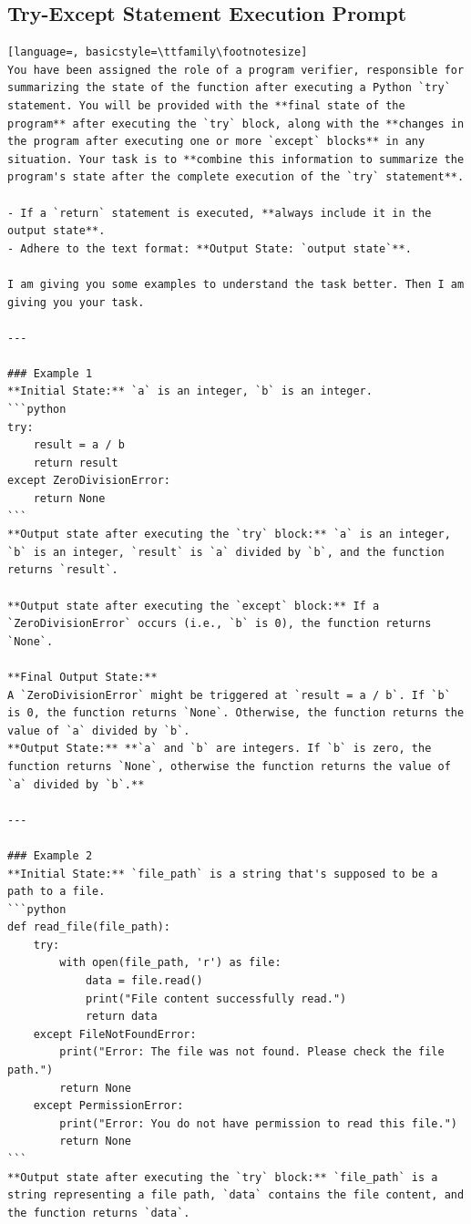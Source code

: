 \documentclass[sigconf]{acmart}
\begin{document}
\subsection{Try-Except Statement Execution Prompt}
\label{try_except_prompt}
\begin{tcolorbox}[ colback=gray!10, colframe=black, arc=5pt]
\begin{lstlisting}[language=, basicstyle=\ttfamily\footnotesize]
You have been assigned the role of a program verifier, responsible for summarizing the state of the function after executing a Python `try` statement. You will be provided with the **final state of the program** after executing the `try` block, along with the **changes in the program after executing one or more `except` blocks** in any situation. Your task is to **combine this information to summarize the program's state after the complete execution of the `try` statement**.

- If a `return` statement is executed, **always include it in the output state**.
- Adhere to the text format: **Output State: `output state`**.

I am giving you some examples to understand the task better. Then I am giving you your task.

---

### Example 1  
**Initial State:** `a` is an integer, `b` is an integer.  
```python
try:
    result = a / b
    return result
except ZeroDivisionError:
    return None
```
**Output state after executing the `try` block:** `a` is an integer, `b` is an integer, `result` is `a` divided by `b`, and the function returns `result`.

**Output state after executing the `except` block:** If a `ZeroDivisionError` occurs (i.e., `b` is 0), the function returns `None`.

**Final Output State:**  
A `ZeroDivisionError` might be triggered at `result = a / b`. If `b` is 0, the function returns `None`. Otherwise, the function returns the value of `a` divided by `b`.  
**Output State:** **`a` and `b` are integers. If `b` is zero, the function returns `None`, otherwise the function returns the value of `a` divided by `b`.**

---

### Example 2  
**Initial State:** `file_path` is a string that's supposed to be a path to a file.  
```python
def read_file(file_path):
    try:
        with open(file_path, 'r') as file:
            data = file.read()
            print("File content successfully read.")
            return data
    except FileNotFoundError:
        print("Error: The file was not found. Please check the file path.")
        return None
    except PermissionError:
        print("Error: You do not have permission to read this file.")
        return None
```
**Output state after executing the `try` block:** `file_path` is a string representing a file path, `data` contains the file content, and the function returns `data`.


\end{lstlisting}
\end{tcolorbox}
\end{document}
